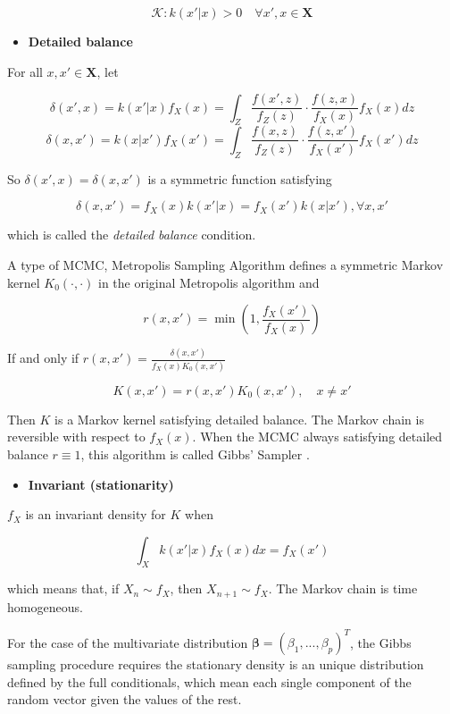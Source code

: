 \documentclass[12pt]{article}
\providecommand{\tightlist}{%
  \setlength{\itemsep}{0pt}\setlength{\parskip}{0pt}}
\begin{document}
\[\mathcal{K}: k(x'|x)>0\quad\forall x', x\in \mathbf{X}\]

\begin{itemize}
\tightlist
\item
  \textbf{Detailed balance}
\end{itemize}

For all \(x, x'\in \mathbf{X}\), let

\[\delta(x',x)=k(x'|x)f_{X}(x)=\int_{Z} \frac{f(x',z)}{f_Z(z)}\cdot\frac{f(z,x)}{f_X(x)}f_{X}(x) dz\]
\[\delta(x,x')=k(x|x')f_{X}(x')=\int_{Z} \frac{f(x,z)}{f_Z(z)}\cdot\frac{f(z,x')}{f_X(x')}f_{X}(x') dz\]

So \(\delta(x',x)=\delta(x,x')\) is a symmetric function satisfying

\[\delta(x,x')=f_X(x)k(x'|x)=f_X(x')k(x|x'), \forall x, x'\]

which is called the \emph{detailed balance} condition.

A type of MCMC, Metropolis Sampling Algorithm defines a symmetric Markov
kernel \(K_0(\cdot,\cdot)\) in the original Metropolis algorithm and

\[r(x,x')=\min\left(1,\frac{f_X(x')}{f_X(x)}\right)\]

If and only if \(r(x,x')=\frac{\delta(x,x')}{f_X(x)K_0(x,x')}\)

\[K(x,x')=r(x,x')K_0(x,x'),\quad x\neq x'\]

Then \(K\) is a Markov kernel satisfying detailed balance. The Markov
chain is reversible with respect to \(f_X(x)\). When the MCMC always
satisfying detailed balance \(r\equiv 1\), this algorithm is called
Gibbs' Sampler
\citep[ch.~10.4.3]{doksumMathematicalStatisticsBasic2015}.

\begin{itemize}
\tightlist
\item
  \textbf{Invariant (stationarity)}
\end{itemize}

\(f_{X}\) is an invariant density for \(K\) when

\[\int_X k(x'|x)f_{X}(x) dx= f_{X}(x')\]

which means that, if \(X_n\sim f_{X}\), then \(X_{n+1}\sim f_{X}\). The
Markov chain is time homogeneous.

For the case of the multivariate distribution
\(\boldsymbol{\beta}=(\beta_1,...,\beta_p)^T\), the Gibbs sampling
procedure requires the stationary density is an unique distribution
defined by the full conditionals, which mean each single component of
the random vector given the values of the rest.
\end{document}
